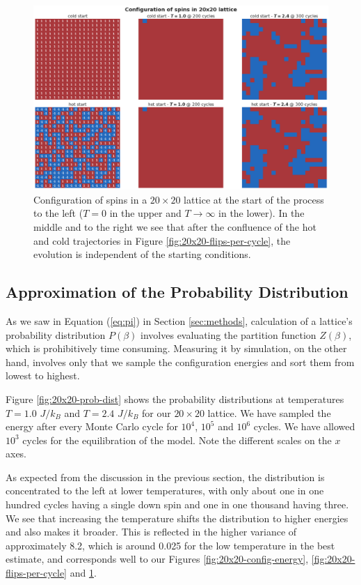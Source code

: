 \documentclass[]{article}
\begin{document}
\begin{figure}[!h]
	\centering
	\includegraphics[width=1\linewidth]{./figs/20x20-config-spins.png}
	\caption{Configuration of spins in a $20 \times 20$ lattice at the start of the process to the left ($T=0$ in the upper and $T \rightarrow \infty$ in the lower). In the middle and to the right we see that after the confluence of the hot and cold trajectories in Figure \ref{fig:20x20-flips-per-cycle}, the evolution is independent of the starting conditions.}
	\label{fig:20x20-config-spins}
\end{figure}

\subsection{Approximation of the Probability Distribution} \label{sec:equilibration}
As we saw in Equation (\ref{eq:pi}) in Section \ref{sec:methods}, calculation of a lattice's probability distribution $P(\beta)$ involves evaluating the partition function $Z(\beta)$, which is prohibitively time consuming. Measuring it by simulation, on the other hand, involves only that we sample the configuration energies and sort them from lowest to highest.

Figure \ref{fig:20x20-prob-dist} shows the probability distributions at temperatures $T = 1.0$ $J/k_B$ and $T = 2.4$ $J/k_B$ for our $20 \times 20$ lattice. We have sampled the energy after every Monte Carlo cycle for $10^4$, $10^5$ and $10^6$ cycles. We have allowed $10^3$ cycles for the equilibration of the model. Note the different scales on the $x$ axes. 

As expected from the discussion in the previous section, the distribution is concentrated to the left at lower temperatures, with only about one in one hundred cycles having a single down spin and one in one thousand having three. We see that increasing the temperature shifts the distribution to higher energies and also makes it broader. This is reflected in the higher variance of approximately 8.2, which is around 0.025 for the low temperature in the best estimate, and corresponds well to our Figures \ref{fig:20x20-config-energy}, \ref{fig:20x20-flips-per-cycle} and \ref{fig:20x20-config-spins}.
\end{document}
